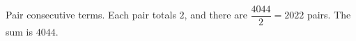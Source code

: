 Pair consecutive terms. Each pair totals $2$, and there are $\dfrac{4044}{2}=2022$ pairs. The sum is $\boxed{4044}$.
